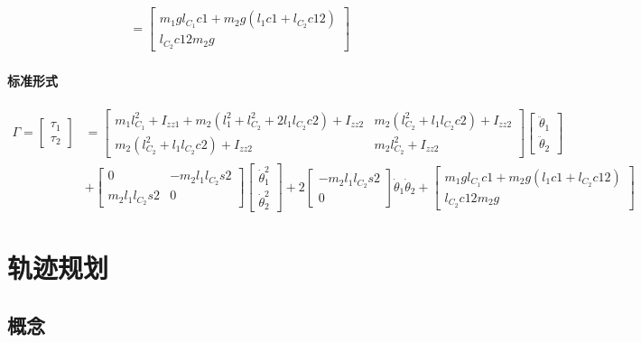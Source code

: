 \documentclass[
12pt, %
a4paper, 
oneside, %
]{scrartcl}
\begin{document}
{\begin{enumerate}
\begin{align*}
&= \begin{bmatrix} m_1 g l_{C_1}c1 + m_2 g(l_1 c1 + l_{C_2}c12) \\ l_{C_2}c12 m_2 g \end{bmatrix}
\end{align*}
\end{enumerate}
\paragraph{标准形式}
\begin{align*}
\Gamma = \begin{bmatrix} \tau_1 \\ \tau_2 \end{bmatrix}
&= \begin{bmatrix} m_1 l_{C_1}^2 + I_{zz1} + m_2(l_1^2 + l_{C_2}^2 + 2l_1 l_{C_2}c2) + I_{zz2} & m_2(l_{C_2}^2 + l_1 l_{C_2}c2) + I_{zz2} \\ m_2(l_{C_2}^2 + l_1 l_{C_2}c2) + I_{zz2} & m_2 l_{C_2}^2 + I_{zz2} \end{bmatrix} \begin{bmatrix} \ddot{\theta}_1 \\ \ddot{\theta}_2 \end{bmatrix} \\  
&+ \begin{bmatrix} 0 & -m_2 l_1 l_{C_2}s2 \\ m_2 l_1 l_{C_2}s2 & 0 \end{bmatrix} \begin{bmatrix} \dot{\theta}_1^2 \\ \dot{\theta}_2^2 \end{bmatrix} + 2\begin{bmatrix} -m_2 l_1 l_{C_2}s2 \\ 0 \end{bmatrix} \dot{\theta}_1 \dot{\theta}_2 + \begin{bmatrix} m_1 g l_{C_1}c1 + m_2 g(l_1 c1 + l_{C_2}c12) \\ l_{C_2}c12 m_2 g \end{bmatrix} 
\end{align*}
}
\section{轨迹规划}
\subsection[概念]{概念}
\end{document}
